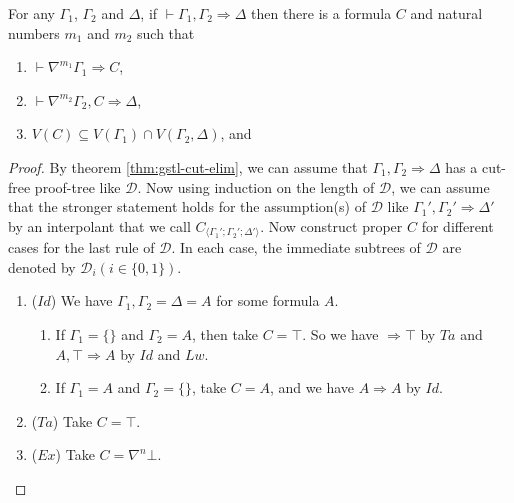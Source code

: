 \begin{thm}\label{thm:stl-dedint}
	For any $\Gamma_1$, $\Gamma_2$ and $\Delta$, if $\vdash \Gamma_1 , \Gamma_2 \Rightarrow \Delta$ then there is a formula $C$ and natural numbers $m_1$ and $m_2$ such that
	\begin{enumerate}[label=(\arabic**)]
		\item $\vdash \nabla^{m_1} \Gamma_1 \Rightarrow C$,
		\item $\vdash \nabla^{m_2} \Gamma_2 , C \Rightarrow \Delta$,
		\item $V(C) \subseteq V(\Gamma_1) \cap V(\Gamma_2,\Delta)$, and
	\end{enumerate}
\end{thm}
\begin{proof}
	By theorem \ref{thm:gstl-cut-elim}, we can assume that $\Gamma_1, \Gamma_2 \Rightarrow \Delta$ has a cut-free proof-tree like $\mathcal{D}$. Now using induction on the length of $\mathcal{D}$, we can assume that the stronger statement holds for the assumption(s) of $\mathcal{D}$ like $\Gamma_1', \Gamma_2' \Rightarrow \Delta'$ by an interpolant that we call $C_{\langle\Gamma_1';\Gamma_2';\Delta'\rangle}$.
	Now construct proper $C$ for different cases for the last rule of $\mathcal{D}$. In each case, the immediate subtrees of $\mathcal{D}$ are denoted by $\mathcal{D}_i (i \in \{0,1\})$.
	\begin{enumerate}
		\item ($Id$) We have $\Gamma_1,\Gamma_2 = \Delta = A$ for some formula $A$.
		\begin{enumerate}
			\item If $\Gamma_1 = \{\}$ and $\Gamma_2 = A$, then take $C = \top$. So we have $\Rightarrow \top$ by $Ta$ and $A , \top \Rightarrow A$ by $Id$ and $Lw$.

			\item If $\Gamma_1 = A$ and $\Gamma_2 = \{\}$, take $C = A$, and we have $A \Rightarrow A$ by $Id$.
		\end{enumerate}
		\item ($Ta$) Take $C = \top$.

		\item ($Ex$) Take $C = \nabla^n \bot$.


\end{enumerate}
\end{proof}
